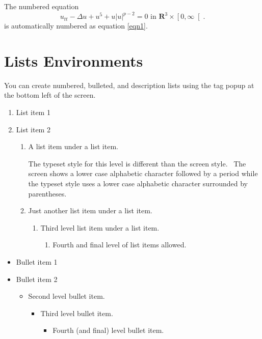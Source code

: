 \documentclass[11pt,spanish]{report}
\begin{document}
The numbered equation
\begin{equation}
u_{tt}-\Delta u+u^{5}+u\left|  u\right|  ^{p-2}=0\text{ in }\mathbf{R}
^{3}\times\left[  0,\infty\right[  .\label{eqn1}
\end{equation}
is automatically numbered as equation \ref{eqn1}.

\section{Lists Environments}

You can create numbered, bulleted, and description lists using the tag popup
at the bottom left of the screen.

\begin{enumerate}
\item List item 1

\item List item 2

\begin{enumerate}
\item A list item under a list item.

The typeset style for this level is different than the screen style. \ The
screen shows a lower case alphabetic character followed by a period while the
typeset style uses a lower case alphabetic character surrounded by parentheses.

\item Just another list item under a list item.

\begin{enumerate}
\item Third level list item under a list item.

\begin{enumerate}
\item Fourth and final level of list items allowed.
\end{enumerate}
\end{enumerate}
\end{enumerate}
\end{enumerate}

\begin{itemize}
\item Bullet item 1

\item Bullet item 2

\begin{itemize}
\item Second level bullet item.

\begin{itemize}
\item Third level bullet item.

\begin{itemize}
\item Fourth (and final) level bullet item.
\end{itemize}
\end{itemize}
\end{itemize}
\end{itemize}
\end{document}
